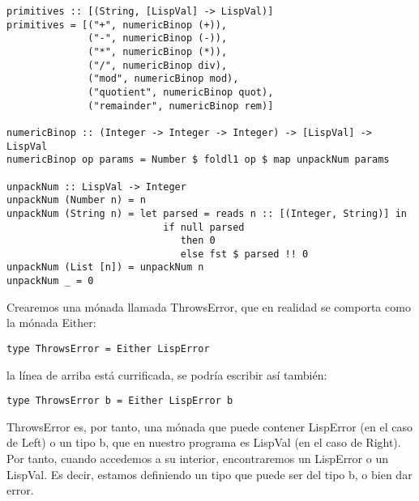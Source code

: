 \begin{minipage}{\linewidth}
\begin{footnotesize}
\begin{lstlisting}[frame=single]
primitives :: [(String, [LispVal] -> LispVal)]
primitives = [("+", numericBinop (+)),
              ("-", numericBinop (-)),
              ("*", numericBinop (*)),
              ("/", numericBinop div),
              ("mod", numericBinop mod),
              ("quotient", numericBinop quot),
              ("remainder", numericBinop rem)]

numericBinop :: (Integer -> Integer -> Integer) -> [LispVal] -> LispVal
numericBinop op params = Number $ foldl1 op $ map unpackNum params
 
unpackNum :: LispVal -> Integer
unpackNum (Number n) = n
unpackNum (String n) = let parsed = reads n :: [(Integer, String)] in 
                           if null parsed 
                              then 0
                              else fst $ parsed !! 0
unpackNum (List [n]) = unpackNum n
unpackNum _ = 0
\end{lstlisting}
\end{footnotesize}
\end{minipage}

Crearemos una m\'onada llamada ThrowsError, que en realidad se comporta como la m\'onada Either:\\

\begin{minipage}{\linewidth}
\begin{small}
\begin{lstlisting}[frame=single]
type ThrowsError = Either LispError
\end{lstlisting}
\end{small}
\end{minipage}

la l\'inea de arriba est\'a currificada, se podr\'ia escribir as\'i tambi\'en:\\

\begin{minipage}{\linewidth}
\begin{small}
\begin{lstlisting}[frame=single]
type ThrowsError b = Either LispError b
\end{lstlisting}
\end{small}
\end{minipage}

ThrowsError es, por tanto, una m\'onada que puede contener LispError (en el caso de Left) o un tipo b, que en nuestro programa es LispVal (en el caso de Right). Por tanto, cuando accedemos a su interior, encontraremos un LispError o un LispVal. Es decir, estamos definiendo un tipo que puede ser del tipo b, o bien dar error.\\

